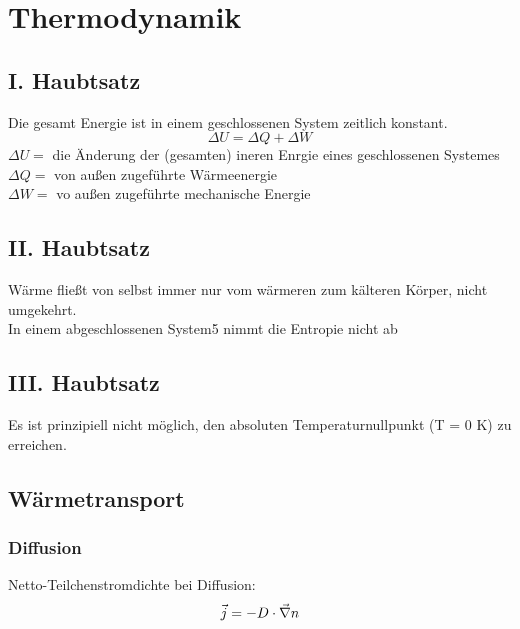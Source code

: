 \documentclass[11pt,letterpaper]{article}
\begin{document}
{
 
 \maketitle
   
 \tableofcontents

\section{Thermodynamik}{
 \subsection{I. Haubtsatz}
 {
    Die gesamt Energie ist in einem geschlossenen System zeitlich konstant.
    \begin{equation*}
        \Delta U = \Delta Q + \Delta W
    \end{equation*} 
    $\Delta U =$ die Änderung der (gesamten) ineren Enrgie eines geschlossenen Systemes\\
    $\Delta Q =$ von außen zugeführte Wärmeenergie\\
    $\Delta W =$ vo außen zugeführte mechanische Energie\\ 
 }

 \subsection{II. Haubtsatz}
 {
    Wärme fließt von selbst immer nur vom wärmeren zum kälteren Körper, nicht
    umgekehrt.\\
    In einem abgeschlossenen System5 nimmt die Entropie nicht ab
 }

 \subsection{III. Haubtsatz}
 {
    Es ist prinzipiell nicht möglich, den absoluten Temperaturnullpunkt (T = 0 K)
    zu erreichen.
 }

\subsection{Wärmetransport}
{
    \subsubsection{Diffusion}
    {
        Netto-Teilchenstromdichte bei Diffusion:
        \begin{equation*}
            \vec{j} = -D\cdot \vec{\nabla}n\\
        \end{equation*}
    }
}}}
\end{document}
